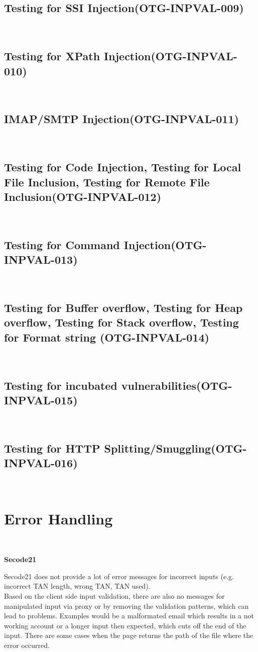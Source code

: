 \documentclass[headsepline,footsepline,footinclude=false,oneside,fontsize=11pt,paper=a4,listof=totoc,bibliography=totoc]{scrbook} %
\begin{document}
\subsection{Testing for SSI Injection(OTG-INPVAL-009)}\
\pagebreak 
\subsection{Testing for XPath Injection(OTG-INPVAL-010)}\
\pagebreak 
\subsection{IMAP/SMTP Injection(OTG-INPVAL-011)}\
\pagebreak 
\subsection{Testing for Code Injection, Testing for Local File Inclusion, Testing for Remote File Inclusion(OTG-INPVAL-012)}\
\pagebreak 
\subsection{Testing for Command Injection(OTG-INPVAL-013)}\
\pagebreak 
\subsection{Testing for Buffer overflow, Testing for Heap overflow, Testing for Stack overflow, Testing for Format string (OTG-INPVAL-014)}\
\pagebreak 
\subsection{Testing for incubated vulnerabilities(OTG-INPVAL-015)}\
\pagebreak 
\subsection{Testing for HTTP Splitting/Smuggling(OTG-INPVAL-016)}\

\section{Error Handling}\

\textbf{Secode21}\

Secode21 does not provide a lot of error messages for incorrect inputs (e.g. incorrect TAN
length, wrong TAN, TAN used). \\ 
Based on the client side input validation, there are also no messages for manipulated input via proxy or by removing the validation patterns, which can lead to problems. Examples would be a malformated email which results in a not working account or a longer input then expected, which cuts off the end of the input. There are some cases when the page returns the path of the file where the error occurred.\\   
 
\end{document}
